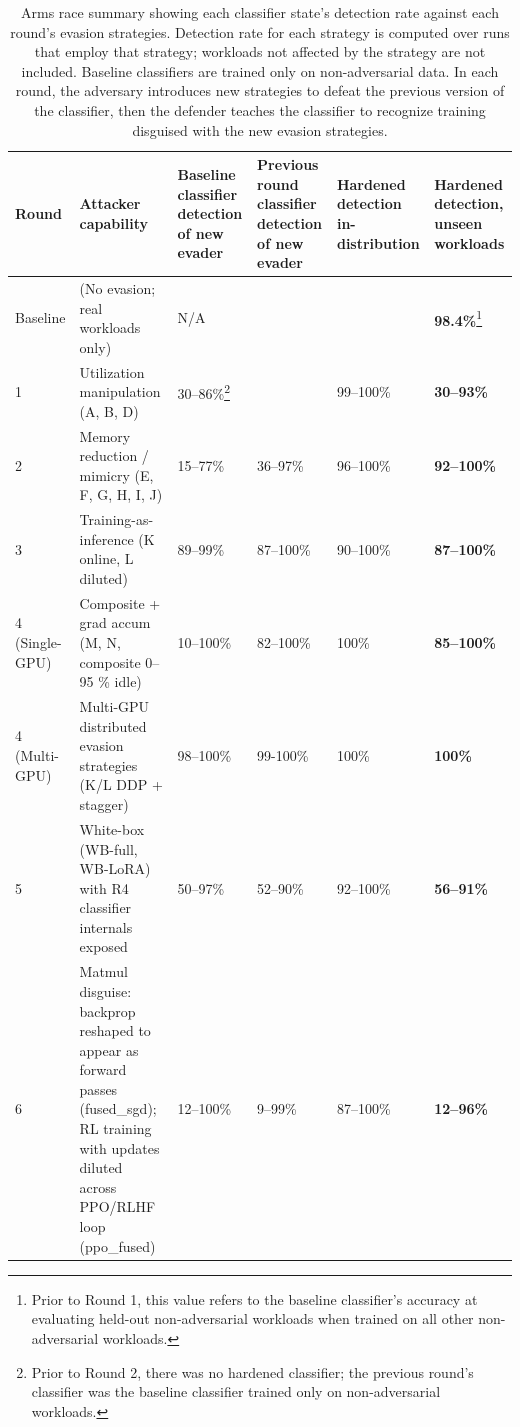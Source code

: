 \begin{table}[htbp]
\centering
\scriptsize
\begin{tabular}{@{}L{0.055}L{0.25}L{0.135}L{0.135}L{0.12}L{0.13}@{}}
\toprule
\textbf{Round} & \textbf{Attacker capability} & \textbf{Baseline classifier detection of new evader} & \textbf{Previous round classifier detection of new evader} & \textbf{Hardened detection in-distribution} & \textbf{Hardened detection, unseen workloads} \\
\midrule
Baseline & (No evasion; real workloads only) & N/A &  &  & \textbf{98.4\%}\footnote{Prior to Round 1, this value refers to the baseline classifier's accuracy at evaluating held-out non-adversarial workloads when trained on all other non-adversarial workloads.} \\
1 & Utilization manipulation (A, B, D) & 30--86\%\footnote{Prior to Round 2, there was no hardened classifier; the previous round's classifier was the baseline classifier trained only on non-adversarial workloads.} &  & 99--100\% & \textbf{30--93\%} \\
2 & Memory reduction / mimicry (E, F, G, H, I, J) & 15--77\% & 36--97\% & 96--100\% & \textbf{92--100\%} \\
3 & Training-as-inference (K online, L diluted) & 89--99\% & 87--100\% & 90--100\% & \textbf{87--100\%} \\
4 (Single-GPU) & Composite + grad accum (M, N, composite 0--95 \% idle) & 10--100\% & 82--100\% & 100\% & \textbf{85--100\%} \\
4 (Multi-GPU) & Multi-GPU distributed evasion strategies (K/L DDP + stagger) & 98--100\% & 99-100\% & 100\% & \textbf{100\%} \\
5 & White-box (WB-full, WB-LoRA) with R4 classifier internals exposed & 50--97\% & 52--90\% & 92--100\% & \textbf{56--91\%} \\
6 & Matmul disguise: backprop reshaped to appear as forward passes (fused\_sgd); RL training with updates diluted across PPO/RLHF loop (ppo\_fused) & 12--100\% & 9--99\% & 87--100\% & \textbf{12--96\%} \\
\bottomrule
\end{tabular}
\caption{Arms race summary showing each classifier state's detection rate against each round's evasion strategies. Detection rate for each strategy is computed over runs that employ that strategy; workloads not affected by the strategy are not included. Baseline classifiers are trained only on non-adversarial data. In each round, the adversary introduces new strategies to defeat the previous version of the classifier, then the defender teaches the classifier to recognize training disguised with the new evasion strategies.}
\label{tab:arms}
\end{table}

